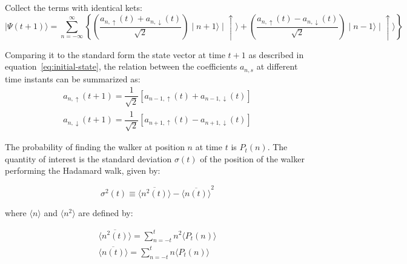 \documentclass[english]{article}
\begin{document}
Collect the terms with identical kets:
\begin{equation}
\mid\!\Psi(t+1)\rangle =  \displaystyle \sum\limits_{n = -\infty}^{\infty} \left\lbrace \left( \dfrac{ a_{n,\uparrow}(t) + a_{n,\downarrow}(t)  }{\sqrt{2}} \right) \mid\! n+1\rangle \mid\!\uparrow\rangle + \left( \dfrac{ a_{n,\uparrow}(t) - a_{n,\downarrow}(t) }{\sqrt{2}} \right) \mid\! n-1\rangle \mid\!\uparrow\rangle   \right\rbrace
\end{equation} 

Comparing it to the standard form the state vector at time $t+1$ as described in equation~\eqref{eq:initial-state}, the relation between the coefficients $a_{n,s}$ at different time instants can be summarized as:
\begin{subequations} \label{eq:ideal-coeff}
\begin{align}
a_{n,\uparrow}(t+1) = \dfrac{1}{\sqrt{2}}[a_{n-1,\uparrow}(t) + a_{n-1,\downarrow}(t)] \\
a_{n,\downarrow}(t+1) = \dfrac{1}{\sqrt{2}}[a_{n+1,\uparrow}(t) - a_{n+1,\downarrow}(t)]
\end{align}
\end{subequations}


The probability of finding the walker at position $n$ at time $t$ is $P_{t}(n)$. The quantity of interest is the standard deviation $\sigma(t)$ of the position of the walker performing the Hadamard walk, given by:

$$\sigma^{2}(t) \equiv \overline{\langle n^{2}(t) \rangle} - \overline{\langle n(t) \rangle}^{2} $$ 

where $\langle n \rangle$ and $\langle n^{2} \rangle$ are defined by: 

\begin{eqnarray}
\overline{\langle n^{2}(t) \rangle} = \displaystyle \sum\limits_{n = -t}^{t} n^{2} \langle P_{t}(n)\rangle \\
\overline{\langle n(t) \rangle} = \displaystyle \sum\limits_{n = -t}^{t} n \langle P_{t}(n)\rangle
\end{eqnarray}
\end{document}
